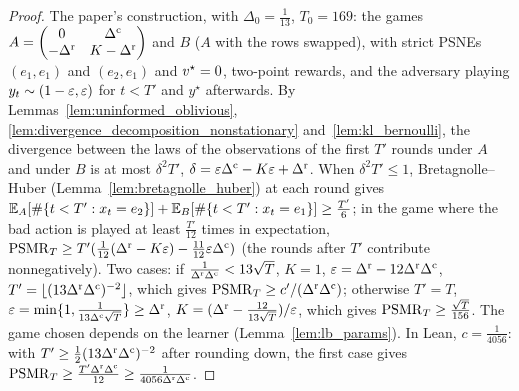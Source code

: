 \begin{proof}
  \leanok
  The paper's construction, with $\Delta_0 = \frac1{13}$, $T_0 = 169$: the games
  $A = \begin{pmatrix} 0 & \Delta^{\mathrm{c}} \\ -\Delta^{\mathrm{r}} & K - \Delta^{\mathrm{r}} \end{pmatrix}$ and $B$ ($A$ with the rows
  swapped), with strict PSNEs $(e_1, e_1)$ and $(e_2, e_1)$ and $v^\star = 0$, two-point rewards, and
  the adversary playing $y_t \sim (1 - \varepsilon, \varepsilon)$ for $t < T'$ and $y^\star$ afterwards. By
  Lemmas~\ref{lem:uninformed_oblivious}, \ref{lem:divergence_decomposition_nonstationary}
  and~\ref{lem:kl_bernoulli}, the divergence between the laws of the observations of the first $T'$
  rounds under $A$ and under $B$ is at most $\delta^2 T'$, $\delta = \varepsilon \Delta^{\mathrm{c}} - K \varepsilon + \Delta^{\mathrm{r}}$. When
  $\delta^2 T' \le 1$, Bretagnolle--Huber (Lemma~\ref{lem:bretagnolle_huber}) at each round gives
  $\mathbb{E}_A[\#\{t < T' : x_t = e_2\}] + \mathbb{E}_B[\#\{t < T' : x_t = e_1\}] \ge \frac{T'}{6}$; in the game where
  the bad action is played at least $\frac{T'}{12}$ times in expectation,
  $\mathrm{PSMR}_T \ge T'(\frac1{12}(\Delta^{\mathrm{r}} - K\varepsilon) - \frac{11}{12} \varepsilon \Delta^{\mathrm{c}})$ (the rounds after $T'$
  contribute nonnegatively). Two cases: if $\frac{1}{\Delta^{\mathrm{r}} \Delta^{\mathrm{c}}} < 13 \sqrt T$, $K = 1$,
  $\varepsilon = \Delta^{\mathrm{r}} - 12 \Delta^{\mathrm{r}} \Delta^{\mathrm{c}}$, $T' = \lfloor (13 \Delta^{\mathrm{r}} \Delta^{\mathrm{c}})^{-2}\rfloor$, which gives
  $\mathrm{PSMR}_T \ge c' / (\Delta^{\mathrm{r}} \Delta^{\mathrm{c}})$; otherwise $T' = T$, $\varepsilon = \min\{1, \frac{1}{13 \Delta^{\mathrm{c}} \sqrt T}\}
  \ge \Delta^{\mathrm{r}}$, $K = (\Delta^{\mathrm{r}} - \frac{12}{13 \sqrt T})/\varepsilon$, which gives $\mathrm{PSMR}_T \ge \frac{\sqrt T}{156}$.
  The game chosen depends on the learner (Lemma~\ref{lem:lb_params}). In Lean, $c = \frac1{4056}$:
  with $T' \ge \frac12 (13 \Delta^{\mathrm{r}} \Delta^{\mathrm{c}})^{-2}$ after rounding down, the first case gives
  $\mathrm{PSMR}_T \ge \frac{T' \Delta^{\mathrm{r}} \Delta^{\mathrm{c}}}{12} \ge \frac{1}{4056 \Delta^{\mathrm{r}} \Delta^{\mathrm{c}}}$.
\end{proof}
